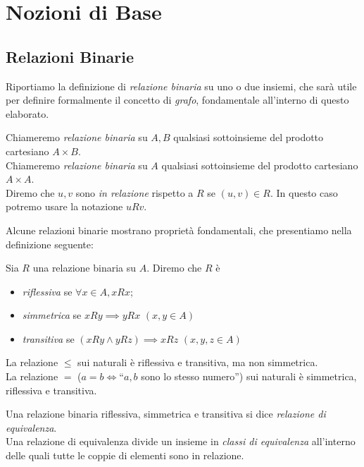 \section{Nozioni di Base}
\label{sec:base}

\subsection{Relazioni Binarie}
Riportiamo la definizione di \emph{relazione binaria} su uno o due insiemi, che sarà utile per definire formalmente il concetto di \emph{grafo}, fondamentale all'interno di questo elaborato.
\begin{definition}
    Chiameremo \emph{relazione binaria} su $A,B$ qualsiasi sottoinsieme del prodotto cartesiano $A \times B$.\\
    Chiameremo \emph{relazione binaria} su $A$ qualsiasi sottoinsieme del prodotto cartesiano $A \times A$.\\
	Diremo che $u,v$ sono \emph{in relazione} rispetto a $R$ se $(u,v) \in R$. In questo caso potremo usare la notazione $u R v$.
\end{definition}
Alcune relazioni binarie mostrano proprietà fondamentali, che presentiamo nella definizione seguente:
\begin{definition}
    Sia $R$ una relazione binaria su $A$. Diremo che $R$ è
    \begin{itemize}
        \item \emph{riflessiva} se $\forall x \in A, x R x$;
        \item \emph{simmetrica} se $x R y \implies y R x \,\,(x,y \in A)$
        \item \emph{transitiva} se $(x R y \land y R z) \implies x R z \,\,(x,y,z \in A)$
    \end{itemize}
\end{definition}
\begin{example}
    La relazione $\leq$ sui naturali è riflessiva e transitiva, ma non simmetrica.\\
    La relazione $=$ ($a = b \iff $``$a,b$ sono lo stesso numero'') sui naturali è simmetrica, riflessiva e transitiva.
\end{example}
\begin{definition}
    Una relazione binaria riflessiva, simmetrica e transitiva si dice \emph{relazione di equivalenza}.\\
    Una relazione di equivalenza divide un insieme in \emph{classi di equivalenza} all'interno delle quali tutte le coppie di elementi sono in relazione.
\end{definition}
